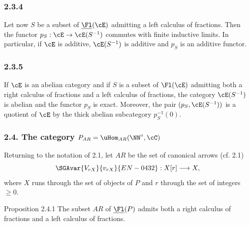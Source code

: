 \subsubsection*{2.3.4}
Let now $S$ be a subset of $\underline{\Fl}(\cE)$ admitting a left calculus of fractions. Then the functor $p_S:\cE\to\cE(S^{-1})$ commutes with finite inductive limits. In particular, if $\cE$ is additive, $\cE(S^{-1})$ is additive and $p_S$ is an additive functor.

\subsubsection*{2.3.5}
If $\cE$ is an abelian category and if $S$ is a subset of $\Fl(\cE)$ admitting both a right calculus of fractions and a left calculus of fractions, the category $\cE(S^{-1})$ is abelian and the functor $p_S$ is exact. Moreover, the pair $(p_S,\cE(S^{-1}))$ is a quotient of $\cE$ by the thick abelian subcategory $p_S^{-1}(0)$.

\subsubsection*{2.4. The category $P_{AR}=\uHom_{AR}(\NN^\circ,\cC)$}
Returning to the notation of 2.1, let $AR$ be the set of canonical arrows (cf. 2.1)
\[
\SGAvar{V_{rX}}{v_{rX}}{EN-0432}:X[r]\longrightarrow X,
\]
where $X$ runs through the set of objects of $P$ and $r$ through the set of integers $\ge0$.

\begin{statement}{Proposition 2.4.1}
The subset $AR$ of $\underline{\Fl}(P)$ admits both a right calculus of fractions and a left calculus of fractions.
\end{statement}

